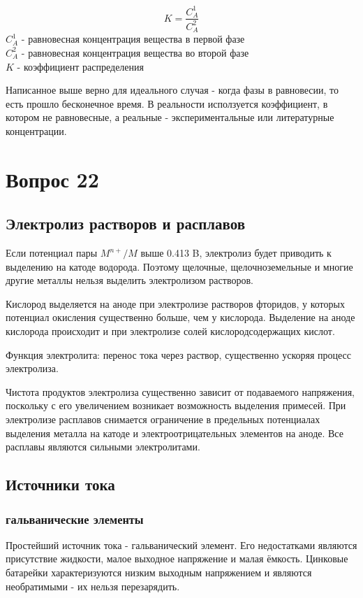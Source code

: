 \documentclass[14pt,a4paper]{scrartcl}
\begin{document}
$$K = \frac{C_A^1}{C_A^2}$$
$C_A^1$ - равновесная концентрация вещества в первой фазе\\
$C_A^2$ - равновесная концентрация вещества во второй фазе\\
$K$ - коэффициент распределения

Написанное выше верно для идеального случая - когда фазы в равновесии, то есть прошло бесконечное время. В реальности исползуется коэффициент, в котором не равновесные, а реальные - экспериментальные или литературные концентрации.


\section*{Вопрос 22}

\subsection*{Электролиз растворов и расплавов}

Если потенциал пары $M^{n+}/M$ выше 0.413 B, электролиз будет приводить к выделению на катоде водорода. Поэтому щелочные, щелочноземельные и многие другие металлы нельзя выделить электролизом растворов.

Кислород выделяется на аноде при электролизе растворов фторидов, у которых потенциал окисления существенно больше, чем у кислорода. Выделение на аноде кислорода происходит и при электролизе солей кислородсодержащих кислот.

Функция электролита: перенос тока через раствор, существенно ускоряя процесс электролиза.

Чистота продуктов электролиза существенно зависит от подаваемого напряжения, поскольку с его увеличением возникает возможность выделения примесей. При электролизе расплавов снимается ограничение в предельных потенциалах выделения металла на катоде и электроотрицательных элементов на аноде. Все расплавы являются сильными электролитами. 

\subsection*{Источники тока}
\subsubsection*{гальванические элементы}
Простейший источник тока - гальванический элемент. Его недостатками являются присутствие жидкости, малое выходное напряжение и малая ёмкость. Цинковые батарейки характеризуются низким выходным напряжением и являются необратимыми - их нельзя перезарядить. 
\end{document}
